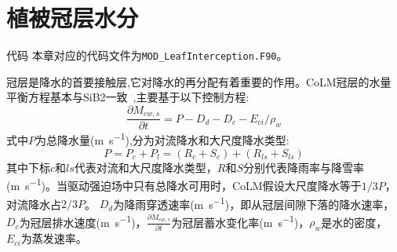 
\chapter{植被冠层水分}\label{植被冠层截留}

\begin{mymdframed}{代码}
本章对应的代码文件为\texttt{MOD\_LeafInterception.F90}。
\end{mymdframed}

冠层是降水的首要接触层,它对降水的再分配有着重要的作用。CoLM冠层的水量平衡方程基本与SiB2一致~\citep{sellers1996revised},主要基于以下控制方程:
\begin{equation}\label{eq:冠层水量控制方程}
\frac{\partial M_{cw,s}}{\partial t} = P-D_{d}-D_{c}-E_{ci} / \rho_{w}
\end{equation}
式中$P$为总降水量(\unit{m.s^{-1}}),分为对流降水和大尺度降水类型:
\begin{equation}\label{eq:降水类型}
P=P_{c}+P_{l}=\left(R_{c}+S_{c}\right)+\left(R_{ls}+S_{ls}\right)
\end{equation}
其中下标$c$和$ls$代表对流和大尺度降水类型，$R$和$S$分别代表降雨率与降雪率(\unit{m.s^{-1}})。当驱动强迫场中只有总降水可用时，CoLM假设大尺度降水等于$1/3P$，对流降水占$2/3P$。
$D_d$为降雨穿透速率(\unit{m.s^{-1}})，即从冠层间隙下落的降水速率，$D_c$为冠层排水速度(\unit{m.s^{-1}})，$\frac{\partial M_{cw,s}}{\partial t}$为冠层蓄水变化率(\unit{m.s^{-1}})，$\rho_w$是水的密度，$E_{ci}$为蒸发速率。

